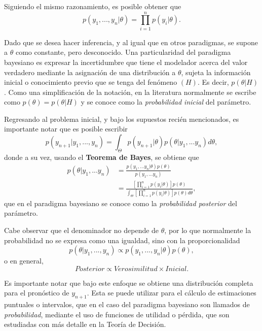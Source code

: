 Siguiendo el mismo razonamiento, es posible obtener que
\begin{equation*}
    p(y_1,...,y_n | \theta) = \prod_{i=1}^n p(y_i|\theta). 
\end{equation*}

Dado que se desea hacer inferencia, y al igual que en otros paradigmas, se supone a $\theta$ como constante, pero desconocido. Una particularidad del paradigma bayesiano es expresar la incertidumbre que tiene el modelador acerca del valor verdadero mediante la asignaci\'on de una distribuci\'on a $\theta$, sujeta la informaci\'on inicial o conocimiento previo que se tenga del fen\'omeno $(H)$. Es decir, $p(\theta|H)$. Como una simplificaci\'on de la notaci\'on, en la literatura normalmente se escribe como $p(\theta) = p(\theta|H)$ y se conoce como la \textit{probabilidad inicial} del par\'ametro.

Regresando al problema inicial, y bajo los supuestos reci\'en mencionados, es importante notar que es posible escribir
\begin{equation*}
    p(y_{n+1} | y_1,...,y_n) =
    \int_{\Theta} 
    p(y_{n+1}|\theta) p(\theta|y_1,...y_n)d\theta,
\end{equation*}
donde a su vez, usando el \textbf{Teorema de Bayes}, se obtiene que
\begin{equation*}
\begin{aligned}
    p(\theta|y_1,...y_n) &=
    \frac{p(y_1,...y_n|\theta)p(\theta)}{p(y_1,...y_n)}\\ &=
    \frac{\left[\prod_{i=1}^n p(y_i|\theta)\right]p(\theta)}
    {\int_{\Theta}\left[\prod_{i=1}^n p(y_i|\theta)\right] p(\theta) d\theta},
\end{aligned}
\end{equation*}
que en el paradigma bayesiano se conoce como la \textit{probabilidad posterior} del par\'ametro.

Cabe observar que el denominador no depende de $\theta$, por lo que normalmente la probabilidad no se expresa como una igualdad, sino con la proporcionalidad
\begin{equation*}
    p(\theta|y_1,...,y_n) \propto p(y_1,...,y_n|\theta)p(\theta),
\end{equation*}
o en general,
\begin{equation*}
    Posterior \propto Verosimilitud \times Inicial.
\end{equation*}

Es importante notar que bajo este enfoque se obtiene una distribuci\'on completa para  el pron\'ostico de $y_{n+1}$. Esta se puede utilizar para el c\'alculo de estimaciones puntuales o intervalos, que en el caso del paradigma bayesiano son llamados de \textit{probabilidad}, mediante el uso de funciones de utilidad o p\'erdida, que son estudiadas con m\'as detalle en la Teor\'ia de Decisi\'on.

